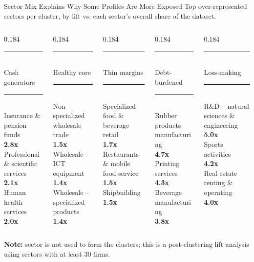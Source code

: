 \documentclass[aspectratio=169,10pt]{beamer}
\newcommand{\liftentry}[2]{#1\\[-0.05cm]{\bfseries #2}\\[0.16cm]}
\newcommand{\clusterhead}[3]{%
  {\color{#1}\rule{0.6ex}{0.6ex}}\hspace{0.45em}{\bfseries #2}\\[-0.02cm]
  {\footnotesize #3}\\[-0.06cm]
  {\color{#1}\rule{\linewidth}{0.7pt}}\\[0.12cm]
}
\begin{document}
\begin{frame}{Sector Mix Explains Why Some Profiles Are More Exposed}
  \small
  Top over-represented sectors per cluster, by lift vs. each sector's overall
  share of the dataset.

  \vspace{0.28cm}
  \begin{columns}[T,onlytextwidth]
    \begin{column}{0.184\textwidth}
      \scriptsize
      \clusterhead{clusterA}{A}{Cash generators}
      \liftentry{Insurance \& pension funds}{2.8x}
      \liftentry{Professional \& scientific services}{2.1x}
      \liftentry{Human health services}{2.0x}
    \end{column}
    \begin{column}{0.184\textwidth}
      \scriptsize
      \clusterhead{clusterB}{B}{Healthy core}
      \liftentry{Non-specialized wholesale trade}{1.5x}
      \liftentry{Wholesale -- ICT equipment}{1.4x}
      \liftentry{Wholesale -- specialized products}{1.4x}
    \end{column}
    \begin{column}{0.184\textwidth}
      \scriptsize
      \clusterhead{clusterC}{C}{Thin margins}
      \liftentry{Specialized food \& beverage retail}{1.7x}
      \liftentry{Restaurants \& mobile food service}{1.5x}
      \liftentry{Shipbuilding}{1.5x}
    \end{column}
    \begin{column}{0.184\textwidth}
      \scriptsize
      \clusterhead{clusterD}{D}{Debt-burdened}
      \liftentry{Rubber products manufacturing}{4.7x}
      \liftentry{Printing services}{4.3x}
      \liftentry{Beverage manufacturing}{3.8x}
    \end{column}
    \begin{column}{0.184\textwidth}
      \scriptsize
      \clusterhead{clusterE}{E}{Loss-making}
      \liftentry{R\&D -- natural sciences \& engineering}{5.0x}
      \liftentry{Sports activities}{4.2x}
      \liftentry{Real estate renting \& operating}{4.0x}
    \end{column}
  \end{columns}

  \vfill
  \scriptsize
  \textbf{Note:} sector is not used to form the clusters; this is a
  post-clustering lift analysis using sectors with at least 30 firms.
\end{frame}
\end{document}
